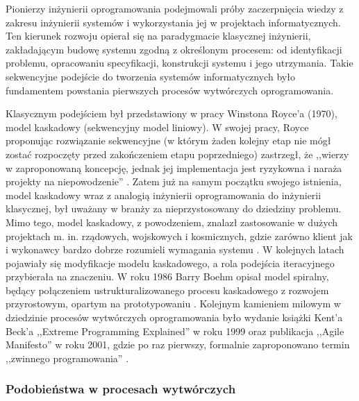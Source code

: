         Pionierzy inżynierii oprogramowania podejmowali próby zaczerpnięcia wiedzy z zakresu inżynierii systemów i wykorzystania jej w projektach informatycznych. Ten kierunek rozwoju opierał się na paradygmacie klasycznej inżynierii, zakładającym budowę systemu zgodną z określonym procesem: od identyfikacji problemu, opracowaniu specyfikacji, konstrukcji systemu i jego utrzymania. Takie sekwencyjne podejście do tworzenia systemów informatycznych było fundamentem powstania pierwszych procesów wytwórczych oprogramowania. 
        
        Klasycznym podejściem był przedstawiony w pracy Winstona Royce'a (1970), model kaskadowy (sekwencyjny model liniowy)\footnotemark.  W swojej pracy, Royce proponując rozwiązanie sekwencyjne (w którym żaden kolejny etap nie mógł zostać rozpoczęty przed zakończeniem etapu poprzedniego) zastrzegł, że ,,wierzy w zaproponowaną koncepcję, jednak jej implementacja jest ryzykowna i naraża projekty na niepowodzenie'' \cite{RWins70}. Zatem już na samym początku swojego istnienia, model kaskadowy wraz z analogią inżynierii oprogramowania do inżynierii klasycznej, był uważany w branży za nieprzystosowany do dziedziny problemu. Mimo tego, model kaskadowy, z powodzeniem, znalazł zastosowanie w dużych projektach m. in. rządowych, wojskowych i kosmicznych, gdzie zarówno klient jak i wykonawcy bardzo dobrze rozumieli wymagania systemu \cite{NasaSE}. W kolejnych latach pojawiały się modyfikacje modelu kaskadowego, a rola podejścia iteracyjnego przybierała na znaczeniu. W roku 1986 Barry Boehm opisał model spiralny, będący połączeniem ustrukturalizowanego procesu kaskadowego z rozwojem przyrostowym, opartym na prototypowaniu \cite{Boehm86}. Kolejnym kamieniem milowym w dziedzinie procesów wytwórczych oprogramowania było wydanie książki Kent'a Beck'a ,,Extreme Programming Explained'' \cite{KBeck00} w roku 1999 oraz publikacja ,,Agile Manifesto'' w roku 2001, gdzie po raz pierwszy, formalnie zaproponowano termin ,,zwinnego programowania'' \cite{MFowl01}. 
      
      \subsubsection{Podobieństwa w procesach wytwórczych}

